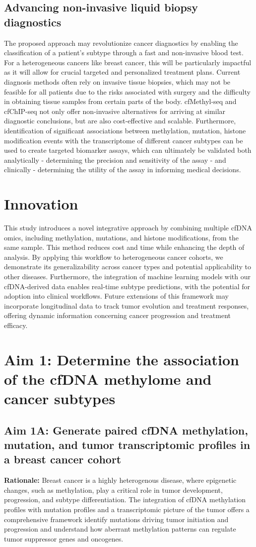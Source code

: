 \documentclass[11pt]{article}
\begin{document}
\subsection*{Advancing non-invasive liquid biopsy diagnostics} 
The proposed approach may revolutionize cancer diagnostics by enabling the
classification of a patient's subtype through a fast and non-invasive blood test.
For a heterogeneous cancers like breast cancer, this will be particularly impactful
as it will allow for crucial targeted and personalized treatment plans. 
Current diagnosis methods often rely on invasive tissue biopsies, 
which may not be feasible for all patients due to the risks associated with
surgery and the difficulty in obtaining tissue samples from certain parts of the body.
cfMethyl-seq and cfChIP-seq not only offer non-invasive alternatives for arriving
at similar diagnostic conclusions, but are also cost-effective and scalable.
Furthermore, identification of significant associations between methylation, mutation, histone modification events with the transcriptome of different cancer subtypes can be used to create targeted biomarker assays, which can ultimately be validated both analytically - determining the precision and sensitivity of the assay - and clinically - determining the utility of the assay in informing medical decisions.
\section*{Innovation}
This study introduces a novel integrative approach by combining multiple cfDNA omics, including methylation, mutations, and histone modifications, from the same sample.
This method reduces cost and time while enhancing the depth of analysis. 
By applying this workflow to heterogeneous cancer cohorts, we demonstrate its generalizability across cancer types and potential applicability to other diseases.
Furthermore, the integration of machine learning models with our cfDNA-derived data enables real-time subtype predictions, with the potential for adoption into clinical workflows.
Future extensions of this framework may incorporate longitudinal data to track tumor evolution and treatment responses, offering dynamic information concerning cancer progression and treatment efficacy.
\newpage
\section*{Aim 1: Determine the association of the cfDNA methylome and cancer subtypes}
\subsection*{Aim 1A: Generate paired cfDNA methylation, mutation, and tumor transcriptomic profiles in a breast cancer cohort}
\textbf{Rationale:}
Breast cancer is a highly heterogenous disease, where epigenetic changes, such as methylation, 
play a critical role in tumor development, progression, and subtype differentiation.
The integration of cfDNA methylation profiles with mutation profiles and a transcriptomic picture of the tumor offers a comprehensive framework identify mutations driving tumor initiation and progression and understand how aberrant methylation patterns can regulate tumor suppressor genes and oncogenes.
\end{document}
